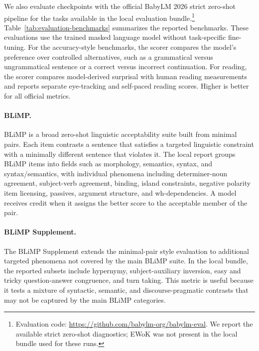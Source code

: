 We also evaluate checkpoints with the official BabyLM 2026 strict zero-shot pipeline for the tasks available in the local evaluation bundle.\footnote{Evaluation code: \url{https://github.com/babylm-org/babylm-eval}. We report the available strict zero-shot diagnostics; EWoK was not present in the local bundle used for these runs.} Table~\ref{tab:evaluation-benchmarks} summarizes the reported benchmarks. These evaluations use the trained masked language model without task-specific fine-tuning. For the accuracy-style benchmarks, the scorer compares the model's preference over controlled alternatives, such as a grammatical versus ungrammatical sentence or a correct versus incorrect continuation. For reading, the scorer compares model-derived surprisal with human reading measurements and reports separate eye-tracking and self-paced reading scores. Higher is better for all official metrics.



\paragraph{BLiMP.}
BLiMP is a broad zero-shot linguistic acceptability suite built from minimal pairs. Each item contrasts a sentence that satisfies a targeted linguistic constraint with a minimally different sentence that violates it. The local report groups BLiMP items into fields such as morphology, semantics, syntax, and syntax/semantics, with individual phenomena including determiner-noun agreement, subject-verb agreement, binding, island constraints, negative polarity item licensing, passives, argument structure, and wh-dependencies. A model receives credit when it assigns the better score to the acceptable member of the pair.

\paragraph{BLiMP Supplement.}
The BLiMP Supplement extends the minimal-pair style evaluation to additional targeted phenomena not covered by the main BLiMP suite. In the local bundle, the reported subsets include hypernymy, subject-auxiliary inversion, easy and tricky question-answer congruence, and turn taking. This metric is useful because it tests a mixture of syntactic, semantic, and discourse-pragmatic contrasts that may not be captured by the main BLiMP categories.

